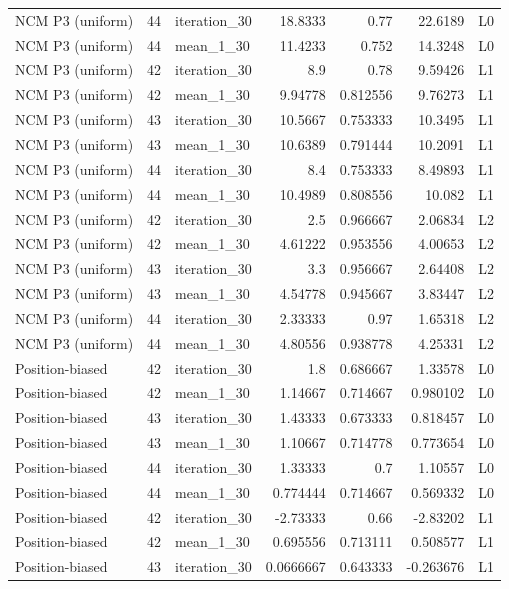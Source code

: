\begin{table}[htbp!]
\begin{tabular}{lrlrrrl}
NCM P3 (uniform) & 44 & iteration\_30 & 18.8333 & 0.77 & 22.6189 & L0 \\
NCM P3 (uniform) & 44 & mean\_1\_30 & 11.4233 & 0.752 & 14.3248 & L0 \\
NCM P3 (uniform) & 42 & iteration\_30 & 8.9 & 0.78 & 9.59426 & L1 \\
NCM P3 (uniform) & 42 & mean\_1\_30 & 9.94778 & 0.812556 & 9.76273 & L1 \\
NCM P3 (uniform) & 43 & iteration\_30 & 10.5667 & 0.753333 & 10.3495 & L1 \\
NCM P3 (uniform) & 43 & mean\_1\_30 & 10.6389 & 0.791444 & 10.2091 & L1 \\
NCM P3 (uniform) & 44 & iteration\_30 & 8.4 & 0.753333 & 8.49893 & L1 \\
NCM P3 (uniform) & 44 & mean\_1\_30 & 10.4989 & 0.808556 & 10.082 & L1 \\
NCM P3 (uniform) & 42 & iteration\_30 & 2.5 & 0.966667 & 2.06834 & L2 \\
NCM P3 (uniform) & 42 & mean\_1\_30 & 4.61222 & 0.953556 & 4.00653 & L2 \\
NCM P3 (uniform) & 43 & iteration\_30 & 3.3 & 0.956667 & 2.64408 & L2 \\
NCM P3 (uniform) & 43 & mean\_1\_30 & 4.54778 & 0.945667 & 3.83447 & L2 \\
NCM P3 (uniform) & 44 & iteration\_30 & 2.33333 & 0.97 & 1.65318 & L2 \\
NCM P3 (uniform) & 44 & mean\_1\_30 & 4.80556 & 0.938778 & 4.25331 & L2 \\
Position-biased & 42 & iteration\_30 & 1.8 & 0.686667 & 1.33578 & L0 \\
Position-biased & 42 & mean\_1\_30 & 1.14667 & 0.714667 & 0.980102 & L0 \\
Position-biased & 43 & iteration\_30 & 1.43333 & 0.673333 & 0.818457 & L0 \\
Position-biased & 43 & mean\_1\_30 & 1.10667 & 0.714778 & 0.773654 & L0 \\
Position-biased & 44 & iteration\_30 & 1.33333 & 0.7 & 1.10557 & L0 \\
Position-biased & 44 & mean\_1\_30 & 0.774444 & 0.714667 & 0.569332 & L0 \\
Position-biased & 42 & iteration\_30 & -2.73333 & 0.66 & -2.83202 & L1 \\
Position-biased & 42 & mean\_1\_30 & 0.695556 & 0.713111 & 0.508577 & L1 \\
Position-biased & 43 & iteration\_30 & 0.0666667 & 0.643333 & -0.263676 & L1 \\

\end{tabular}
\end{table}
